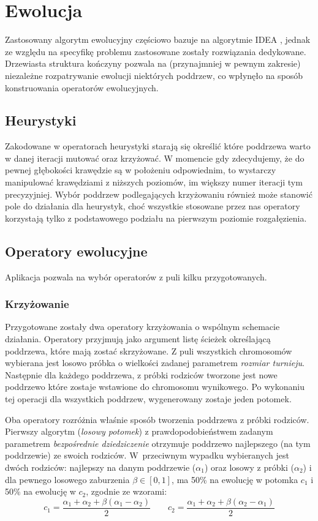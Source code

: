 \documentclass[11pt, leqno]{article}
\renewcommand{\i}[1]{\textit{#1}}
\begin{document}
\section{Ewolucja}
Zastosowany algorytm ewolucyjny częściowo bazuje na algorytmie IDEA \cite{PFI}, jednak ze względu na specyfikę problemu zastosowane zostały rozwiązania dedykowane. Drzewiasta struktura kończyny pozwala na (przynajmniej w pewnym zakresie) niezależne rozpatrywanie ewolucji niektórych poddrzew, co wpłynęło na sposób konstruowania operatorów ewolucyjnych.

\subsection{Heurystyki}
Zakodowane w operatorach heurystyki starają się określić które poddrzewa warto w danej iteracji mutować oraz krzyżować. W momencie gdy zdecydujemy, że do pewnej głębokości krawędzie są w położeniu odpowiednim, to wystarczy manipulować krawędziami z niższych poziomów, im większy numer iteracji tym precyzyjniej. Wybór poddrzew podlegających krzyżowaniu również może stanowić pole do działania dla heurystyk, choć wszystkie stosowane przez nas operatory korzystają tylko z podstawowego podziału na pierwszym poziomie rozgałęzienia.

\subsection{Operatory ewolucyjne}
Aplikacja pozwala na wybór operatorów z puli kilku przygotowanych.

\subsubsection{Krzyżowanie}
Przygotowane zostały dwa operatory krzyżowania o wspólnym schemacie działania. Operatory przyjmują jako argument listę ścieżek określającą poddrzewa, które mają zostać skrzyżowane. Z puli wszystkich chromosomów wybierana jest losowo próbka o wielkości zadanej parametrem \i{rozmiar turnieju}. Następnie dla każdego poddrzewa, z próbki rodziców tworzone jest nowe poddrzewo które zostaje wstawione do chromosomu wynikowego. Po wykonaniu tej operacji dla wszystkich poddrzew, wygenerowany zostaje jeden potomek.

Oba operatory rozróżnia właśnie sposób tworzenia poddrzewa z próbki rodziców. Pierwszy algorytm (\i{losowy potomek}) z prawdopodobieństwem zadanym parametrem \i{bezpośrednie dziedziczenie} otrzymuje poddrzewo najlepszego (na tym poddrzewie) ze swoich rodziców. W~przeciwnym wypadku wybieranych jest dwóch rodziców: najlepszy na danym poddrzewie ($\alpha_1$) oraz losowy z próbki ($\alpha_2$) i dla pewnego losowego zaburzenia $\beta\in[0, 1]$, ma 50\% na ewolucję w potomka $c_1$ i 50\% na ewolucję w $c_2$, zgodnie ze wzorami:
	\[
		c_1 = \frac{\alpha_1 + \alpha_2 + \beta(\alpha_1 - \alpha_2)}{2} \quad\quad c_2 = \frac{\alpha_1 + \alpha_2 + \beta(\alpha_2 - \alpha_1)}{2}
	\]
\end{document}
